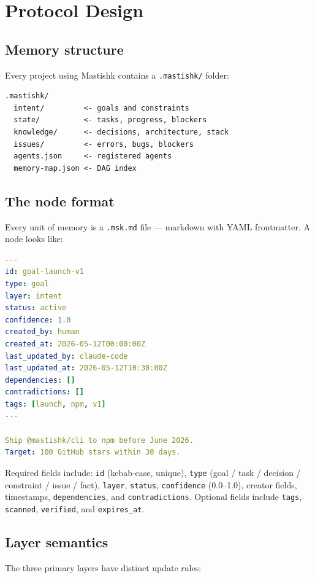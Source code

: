 \documentclass[11pt]{article}
\begin{document}
\section{Protocol Design}
\label{sec:protocol}

\subsection{Memory structure}

Every project using Mastishk contains a \texttt{.mastishk/} folder:

\begin{lstlisting}
.mastishk/
  intent/         <- goals and constraints
  state/          <- tasks, progress, blockers
  knowledge/      <- decisions, architecture, stack
  issues/         <- errors, bugs, blockers
  agents.json     <- registered agents
  memory-map.json <- DAG index
\end{lstlisting}

\subsection{The node format}

Every unit of memory is a \texttt{.msk.md} file --- markdown with YAML frontmatter. A node looks like:

\begin{lstlisting}[language=yaml]
---
id: goal-launch-v1
type: goal
layer: intent
status: active
confidence: 1.0
created_by: human
created_at: 2026-05-12T00:00:00Z
last_updated_by: claude-code
last_updated_at: 2026-05-12T10:30:00Z
dependencies: []
contradictions: []
tags: [launch, npm, v1]
---

Ship @mastishk/cli to npm before June 2026.
Target: 100 GitHub stars within 30 days.
\end{lstlisting}

Required fields include: \texttt{id} (kebab-case, unique), \texttt{type} (goal / task / decision / constraint / issue / fact), \texttt{layer}, \texttt{status}, \texttt{confidence} (0.0--1.0), creator fields, timestamps, \texttt{dependencies}, and \texttt{contradictions}. Optional fields include \texttt{tags}, \texttt{scanned}, \texttt{verified}, and \texttt{expires\_at}.

\subsection{Layer semantics}

The three primary layers have distinct update rules:
\end{document}
